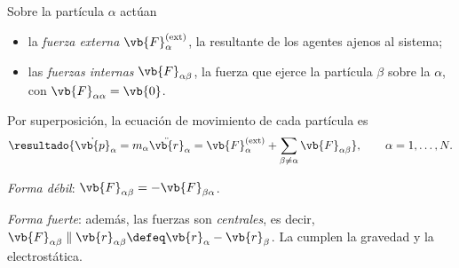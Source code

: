\begin{definicion}
Sobre la partícula $\alpha$ actúan
\begin{itemize}
  \item la \emph{fuerza externa} $\vb{F}_{\alpha}\ext$, la resultante de los agentes
        ajenos al sistema;
  \item las \emph{fuerzas internas} $\vb{F}_{\alpha\beta}$, la fuerza que ejerce la partícula
        $\beta$ sobre la $\alpha$, con $\vb{F}_{\alpha\alpha}=\vb{0}$.
\end{itemize}
Por superposición, la ecuación de movimiento de cada partícula es
\begin{equation}
  \resultado{\dot{\vb{p}}_{\alpha}=m_{\alpha}\ddot{\vb{r}}_{\alpha}
  =\vb{F}_{\alpha}\ext+\sum_{\beta\neq\alpha}\vb{F}_{\alpha\beta}},
  \qquad \alpha=1,\dots,N .
  \label{eq:newton-alpha}
\end{equation}
\end{definicion}

\begin{definicion}
\label{def:tercera}
\begin{casos}
  \item \emph{Forma débil}: $\vb{F}_{\alpha\beta}=-\vb{F}_{\beta\alpha}$.
  \item \emph{Forma fuerte}: además, las fuerzas son \emph{centrales}, es decir,
        $\vb{F}_{\alpha\beta}\parallel\vb{r}_{\alpha\beta}\defeq\vb{r}_{\alpha}-\vb{r}_{\beta}$.
        La cumplen la gravedad y la electrostática.
\end{casos}
\end{definicion}

